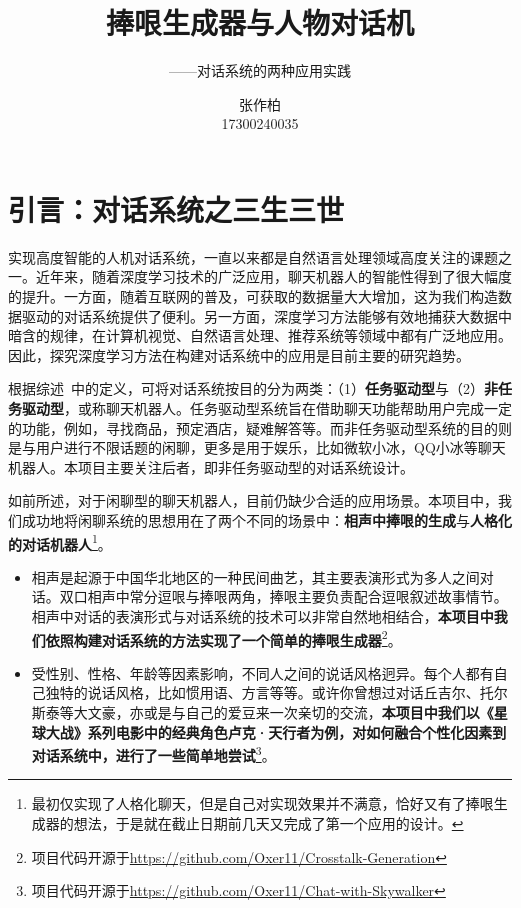 \documentclass[12pt]{article} %
\title{\textbf{捧哏生成器与人物对话机}}
\subtitle{——对话系统的两种应用实践}
\author{张作柏\\17300240035}
\begin{document}
\begin{sloppypar}
\maketitle

\pagestyle{fancy}
\lhead{\textbf{{\thetitle}}}
\rhead{\textbf{\nouppercase{\firstleftmark}}}
\cfoot{\thepage}

\thispagestyle{empty}
\tableofcontents
\clearpage

\setcounter{page}{1}


\section{引言：对话系统之三生三世}

实现高度智能的人机对话系统，一直以来都是自然语言处理领域高度关注的课题之一。近年来，随着深度学习技术的广泛应用，聊天机器人的智能性得到了很大幅度的提升。一方面，随着互联网的普及，可获取的数据量大大增加，这为我们构造数据驱动的对话系统提供了便利。另一方面，深度学习方法能够有效地捕获大数据中暗含的规律，在计算机视觉、自然语言处理、推荐系统等领域中都有广泛地应用。因此，探究深度学习方法在构建对话系统中的应用是目前主要的研究趋势。

根据综述~\cite{chen2017survey}中的定义，可将对话系统按目的分为两类：（1）{\bf 任务驱动型}与（2）{\bf 非任务驱动型}，或称聊天机器人。任务驱动型系统旨在借助聊天功能帮助用户完成一定的功能，例如，寻找商品，预定酒店，疑难解答等。而非任务驱动型系统的目的则是与用户进行不限话题的闲聊，更多是用于娱乐，比如微软小冰，QQ小冰等聊天机器人。本项目主要关注后者，即非任务驱动型的对话系统设计。

如前所述，对于闲聊型的聊天机器人，目前仍缺少合适的应用场景。本项目中，我们成功地将闲聊系统的思想用在了两个不同的场景中：{\bf 相声中捧哏的生成}与{\bf 人格化的对话机器人}\footnote{最初仅实现了人格化聊天，但是自己对实现效果并不满意，恰好又有了捧哏生成器的想法，于是就在截止日期前几天又完成了第一个应用的设计。}。
\vspace*{-0.25cm}
\begin{itemize}
\item 相声是起源于中国华北地区的一种民间曲艺，其主要表演形式为多人之间对话。双口相声中常分逗哏与捧哏两角，捧哏主要负责配合逗哏叙述故事情节。相声中对话的表演形式与对话系统的技术可以非常自然地相结合，{\bf 本项目中我们依照构建对话系统的方法实现了一个简单的捧哏生成器}\footnote{项目代码开源于\url{https://github.com/Oxer11/Crosstalk-Generation}}。\vspace*{-0.3cm}
\item 受性别、性格、年龄等因素影响，不同人之间的说话风格迥异。每个人都有自己独特的说话风格，比如惯用语、方言等等。或许你曾想过对话丘吉尔、托尔斯泰等大文豪，亦或是与自己的爱豆来一次亲切的交流，{\bf 本项目中我们以《星球大战》系列电影中的经典角色卢克·天行者为例，对如何融合个性化因素到对话系统中，进行了一些简单地尝试}\footnote{项目代码开源于\url{https://github.com/Oxer11/Chat-with-Skywalker}}。
\end{itemize}


\end{sloppypar}
\end{document}
